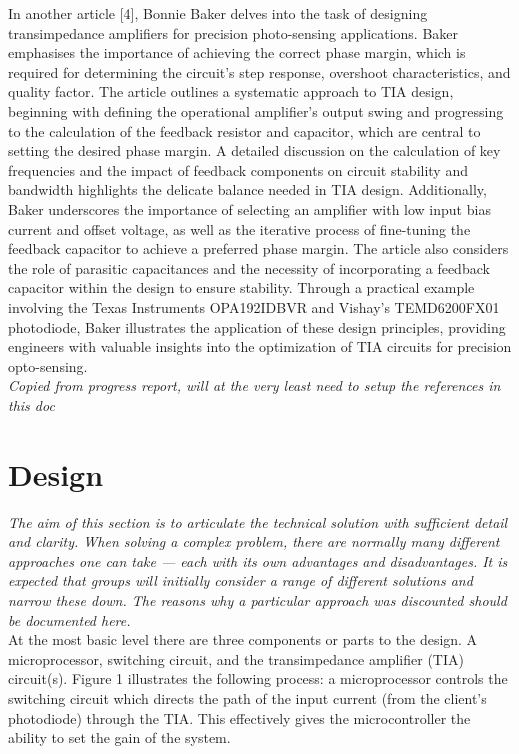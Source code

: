 \documentclass[conference]{IEEEtran}
\begin{document}
In another article [4], Bonnie Baker delves into the task of designing transimpedance amplifiers for precision photo-sensing applications. Baker emphasises the importance of achieving the correct phase margin, which is required for determining the circuit’s step response, overshoot characteristics, and quality factor. The article outlines a systematic approach to TIA design, beginning with defining the operational amplifier's output swing and progressing to the calculation of the feedback resistor and capacitor, which are central to setting the desired phase margin. A detailed discussion on the calculation of key frequencies and the impact of feedback components on circuit stability and bandwidth highlights the delicate balance needed in TIA design. Additionally, Baker underscores the importance of selecting an amplifier with low input bias current and offset voltage, as well as the iterative process of fine-tuning the feedback capacitor to achieve a preferred phase margin. The article also considers the role of parasitic capacitances and the necessity of incorporating a feedback capacitor within the design to ensure stability. Through a practical example involving the Texas Instruments OPA192IDBVR and Vishay's TEMD6200FX01 photodiode, Baker illustrates the application of these design principles, providing engineers with valuable insights into the optimization of TIA circuits for precision opto-sensing.\\

\textit{Copied from progress report, will at the very least need to setup the references in this doc}

\section{Design}

\textit{The aim of this section is to articulate the technical solution with sufficient detail and clarity. When solving a complex problem, there are normally many different approaches one can take — each with its own advantages and disadvantages. It is expected that groups will initially consider a range of different solutions and narrow these down. The reasons why a particular approach was discounted should be documented here.} \\

At the most basic level there are three components or parts to the design. A microprocessor, switching circuit, and the transimpedance amplifier (TIA) circuit(s). Figure 1 illustrates the following process: a microprocessor controls the switching circuit which directs the path of the input current (from the client’s photodiode) through the TIA. This effectively gives the microcontroller the ability to set the gain of the system. \\
\end{document}

